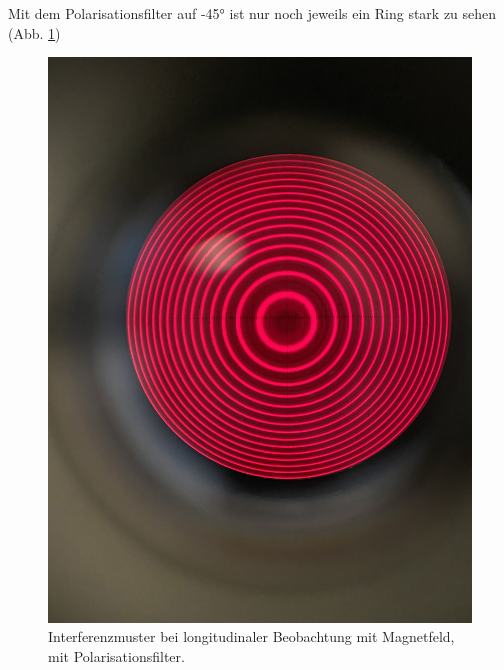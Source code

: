 \documentclass{article}
\begin{document}
\begin{multicols}{2}
Mit dem Polarisationsfilter auf \ang{-45} ist nur noch jeweils ein Ring stark zu sehen (Abb. \ref{fig:zeeman-longitudinal-mit--45})
\begin{figure}[H]
  \centering
  \includegraphics[width=.8\linewidth]{zeeman-longitudinal-mit--45}
  \caption{Interferenzmuster bei longitudinaler Beobachtung mit Magnetfeld, mit Polarisationsfilter.}
  \label{fig:zeeman-longitudinal-mit--45}
\end{figure}


\end{multicols}
\end{document}
